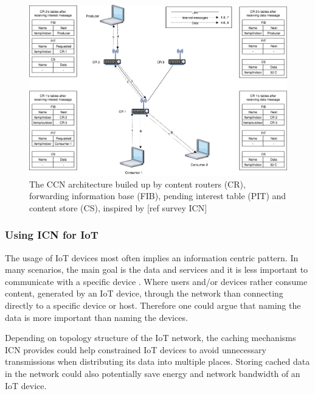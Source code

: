 \begin{figure}
	\includegraphics[width=\textwidth]{figures/CCN-architecture.png}
	\caption{The CCN architecture builed up by content routers (CR), forwarding information base (FIB), pending interest table (PIT) and content store (CS), inspired by [ref survey ICN]}
	\label{fig:CCN-architecture}
\end{figure}



\subsubsection{Using ICN for IoT}
The usage of IoT devices most often implies an information centric pattern. In many scenarios, the main goal is the data and services and it is less important to communicate with a specific device \cite{Ahlgreniot}. Where users and/or devices rather consume content, generated by an IoT device, through the network than connecting directly to a specific device or host. Therefore one could argue that naming the data is more important than naming the devices.

Depending on topology structure of the IoT network, the caching mechanisms ICN provides could help constrained IoT devices to avoid unnecessary transmissions when distributing its data into multiple places. Storing cached data in the network could also potentially save energy and network bandwidth of an IoT device.

